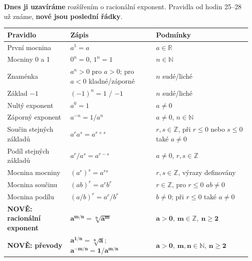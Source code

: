 \documentclass[11pt,a4paper]{article}
\begin{document}
\textbf{Dnes ji uzavíráme} rozšířením o racionální exponent.
Pravidla od hodin 25--28 už známe, \textbf{nové jsou poslední řádky}.
\begin{center}\scriptsize
\begin{tabularx}{\linewidth}{@{}>{\raggedright\arraybackslash}p{34mm}>{\raggedright\arraybackslash}p{53mm}X@{}}
\toprule
\textbf{Pravidlo} & \textbf{Zápis} & \textbf{Podmínky}\\\midrule
První mocnina & $a^1=a$ & $a\in\mathbb R$\\
Mocniny 0 a 1 & $0^n=0$, $1^n=1$ & $n\in\mathbb N$\\
Znaménka & $a^n>0$ pro $a>0$; pro $a<0$ kladné/záporné & $n$ sudé/liché\\
Základ $-1$ & $(-1)^n=1$ / $-1$ & $n$ sudé/liché\\
Nultý exponent & $a^0=1$ & $a\ne0$\\
Záporný exponent & $a^{-n}=1/a^n$ & $a\ne0$, $n\in\mathbb N$\\
Součin stejných základů & $a^r a^s=a^{r+s}$ & $r,s\in\mathbb Z$, při $r\le0$ nebo $s\le0$ také $a\ne0$\\
Podíl stejných základů & $a^r/a^s=a^{r-s}$ & $a\ne0$, $r,s\in\mathbb Z$\\
Mocnina mocniny & $(a^r)^s=a^{rs}$ & $r,s\in\mathbb Z$, výrazy definovány\\
Mocnina součinu & $(ab)^r=a^rb^r$ & $r\in\mathbb Z$, pro $r\le0$ $ab\ne0$\\
Mocnina podílu & $(a/b)^r=a^r/b^r$ & $b\ne0$; při $r\le0$ také $a\ne0$\\\midrule
\textbf{NOVĚ: racionální exponent} & $\boldsymbol{a^{m/n}=\sqrt[n]{a^m}}$ & $\boldsymbol{a>0,\ m\in\mathbb Z,\ n\ge2}$\\
\textbf{NOVĚ: převody} & $\boldsymbol{a^{1/n}=\sqrt[n]a}$; $\boldsymbol{a^{-m/n}=1/a^{m/n}}$ & $\boldsymbol{a>0,\ m,n\in\mathbb N,\ n\ge2}$\\\bottomrule
\end{tabularx}\normalsize\end{center}
\end{document}
